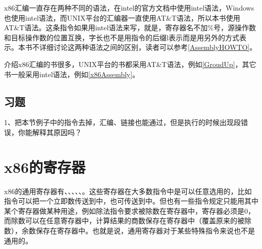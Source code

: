 \begin{BookNote}


x86汇编一直存在两种不同的语法，在intel的官方文档中使用intel语法，Windows也使用intel语法，而UNIX平台的汇编器一直使用AT\&T语法，所以本书使用AT\&T语法。这条指令如果用intel语法来写，就是，寄存器名不加\%号，源操作数和目标操作数的位置互换，字长也不是用指令的后缀l表示而是用另外的方式表示。本书不详细讨论这两种语法之间的区别，读者可以参考\hyperlink{db.bi01.bibli.assemblyhowto}{[AssemblyHOWTO]}。



介绍x86汇编的书很多，UNIX平台的书都采用AT\&T语法，例如\hyperlink{db.bi01.bibli.groundup}{[GroudUp]}，其它书一般采用intel语法，例如\hyperlink{db.bi01.bibli.x86assembly}{[x86Assembly]}。

\end{BookNote}

\subsection*{习题}
%


1、把本节例子中的指令去掉，汇编、链接也能通过，但是执行的时候出现段错误，你能解释其原因吗？




\section{x86的寄存器}
%
x86的通用寄存器有、、、、、。这些寄存器在大多数指令中是可以任意选用的，比如指令可以把一个立即数传送到中，也可传送到中。但也有一些指令规定只能用其中某个寄存器做某种用途，例如除法指令要求被除数在寄存器中，寄存器必须是0，而除数可以在任意寄存器中，计算结果的商数保存在寄存器中（覆盖原来的被除数），余数保存在寄存器中。也就是说，通用寄存器对于某些特殊指令来说也不是通用的。




